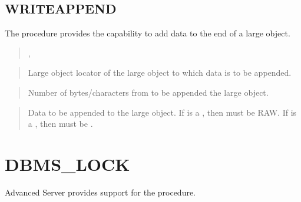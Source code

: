 \documentclass[letterpaper,10pt,english,openany,oneside]{sphinxmanual}
\begin{document}
\newpage


\subsection{WRITEAPPEND}
\label{\detokenize{writeappend::doc}}\label{\detokenize{writeappend:writeappend}}
The  procedure provides the capability to add data to the end
of a large object.
\begin{quote}

,
\begin{quote}

\end{quote}
\end{quote}


\begin{quote}

Large object locator of the large object to which data is to be
appended.
\end{quote}

\begin{quote}

Number of bytes/characters from  to be appended the large
object.
\end{quote}

\begin{quote}

Data to be appended to the large object. If  is a , then
 must be RAW. If  is a , then  must be
.
\end{quote}

\newpage


\section{DBMS\_LOCK}
\label{\detokenize{dbms_lock::doc}}\label{\detokenize{dbms_lock:dbms-lock}}
Advanced Server provides support for the  procedure.
\end{document}
